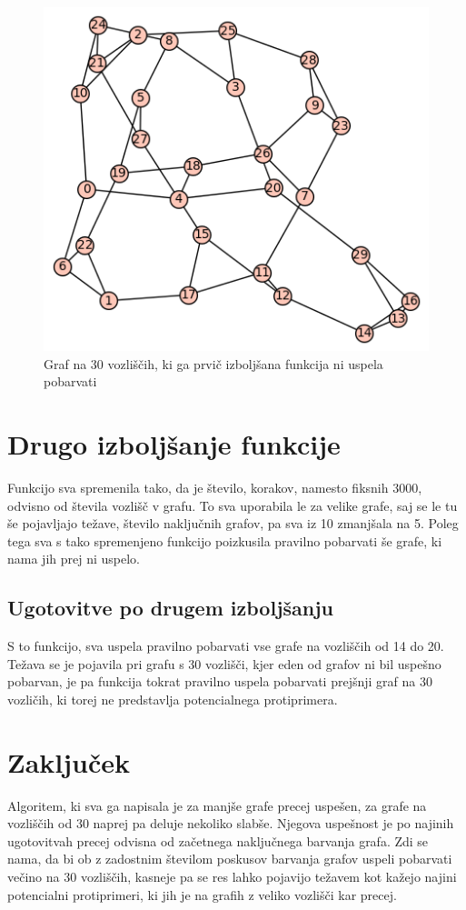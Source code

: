 \documentclass[12pt, a4paper]{article}
\begin{document}
\begin{figure}[H]
  \includegraphics[width=\linewidth]{30_proti.png}
  \caption{Graf na 30 vozliščih, ki ga prvič izboljšana funkcija ni uspela pobarvati}
  \label{fig:Graf na 30 vozliščih, ki ga izboljšana funkcija ni uspela pobarvati}
\end{figure}


\section{Drugo izboljšanje funkcije}

Funkcijo sva spremenila tako, da je število, korakov, namesto fiksnih 3000, odvisno od števila vozlišč v grafu. To sva uporabila le za velike grafe, saj se le tu še pojavljajo težave, število naključnih grafov, pa sva iz 10 zmanjšala na 5. Poleg tega sva s tako spremenjeno funkcijo poizkusila pravilno pobarvati še grafe, ki nama jih prej ni uspelo.

\subsection{Ugotovitve po drugem izboljšanju}

S to funkcijo, sva uspela pravilno pobarvati vse grafe na vozliščih od 14 do 20. Težava se je pojavila pri grafu s 30 vozlišči, kjer eden od grafov ni bil uspešno pobarvan, je pa funkcija tokrat pravilno uspela pobarvati prejšnji graf na 30 vozličih, ki torej ne predstavlja potencialnega protiprimera.


\section{Zaključek}
Algoritem, ki sva ga napisala je za manjše grafe precej uspešen, za grafe na vozliščih od 30 naprej pa deluje nekoliko slabše. Njegova uspešnost je po najinih ugotovitvah precej odvisna od začetnega naključnega barvanja grafa. Zdi se nama, da bi ob z zadostnim številom poskusov barvanja grafov uspeli pobarvati večino na 30 vozliščih, kasneje pa se res lahko pojavijo težavem kot kažejo najini potencialni protiprimeri, ki jih je na grafih z veliko vozlišči kar precej.
\end{document}
